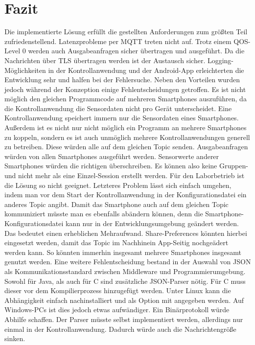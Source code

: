 \documentclass[11pt,a4paper]{report}
\begin{document}
\chapter{Fazit}\label{chap:fazit}
Die implementierte Lösung erfüllt die gestellten Anforderungen zum größten Teil zufriedenstellend.
Latenzprobleme per MQTT treten nicht auf.
Trotz einem QOS-Level 0 werden auch Ausgabeanfragen sicher übertragen und ausgeführt.
Da die Nachrichten über TLS übertragen werden ist der Austausch sicher.
Logging-Möglichkeiten in der Kontrollanwendung und der Android-App erleichterten die Entwicklung sehr und halfen bei der Fehlersuche.
Neben den Vorteilen wurden jedoch während der Konzeption einige Fehlentscheidungen getroffen.
Es ist nicht möglich den gleichen Programmcode auf mehreren Smartphones auszuführen, da die Kontrollanwendung die Sensordaten nicht pro Gerät unterscheidet.
Eine Kontrollanwendung speichert immern nur die Sensordaten eines Smartphones.
Außerdem ist es nicht nur nicht möglich ein Programm an mehrere Smartphones zu koppeln, sondern es ist auch unmöglich mehrere Kontrollanwendungen generell zu betreiben.
Diese würden alle auf dem gleichen Topic senden.
Ausgabeanfragen würden von allen Smartphones ausgeführt werden.
Sensorwerte anderer Smartphones würden die richtigen überschreiben.
Es können also keine Gruppen- und nicht mehr als eine Einzel-Session erstellt werden.
Für den Laborbetrieb ist die Lösung so nicht geeignet.
Letzteres Problem lässt sich einfach umgehen, indem man vor dem Start der Kontrollanwendung in der Konfigurationsdatei ein anderes Topic angibt.
Damit das Smartphone auch auf dem gleichen Topic kommuniziert müsste man es ebenfalls abändern können, denn die Smartphone-Konfigurationsdatei kann nur in der Entwicklungsumgebung geändert werden.
Das bedeutet einen erheblichen Mehraufwand.
Share-Preferences könnten hierbei eingesetzt werden, damit das Topic im Nachhinein App-Seitig nochgeädert werden kann.
So könnten immerhin insgesamt mehrere Smartphones insgesamt genutzt werden.
Eine weitere Fehlentscheidung bestand in der Auswahl von JSON als Kommunikationsstandard zwischen Middleware und Programmierumgebung.
Sowohl für Java, als auch für C sind zusätzliche JSON-Parser nötig.
Für C muss dieser vor dem Kompilierprozess hinzugefügt werden.
Unter Linux kann die Abhängigkeit einfach nachinstalliert und als Option mit angegeben werden.
Auf Windows-PCs ist dies jedoch etwas aufwändiger.
Ein Binärprotokoll würde Abhilfe schaffen.
Der Parser müsste selbst implementiert werden, allerdings nur einmal in der Kontrollanwendung.
Dadurch würde auch die Nachrichtengröße sinken.
\end{document}
